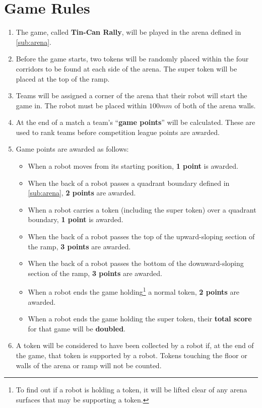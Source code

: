 \section {Game Rules}
\label{game-rules}

\begin{enumerate}
\item The game, called \textbf{Tin-Can Rally}, will be played in the arena defined in \autoref{sub:arena}.
\item Before the game starts, two tokens will be randomly placed within the four corridors to be found at each side of the arena.  The super token will be placed at the top of the ramp.
\item Teams will be assigned a corner of the arena that their robot will start the game in.
 The robot must be placed within $100mm$ of both of the arena walls.
\item At the end of a match a team's ``\textbf{game points}'' will be calculated.
 These are used to rank teams before competition league points are awarded.

\item Game points are awarded as follows:

\begin{itemize}
\item When a robot moves from its starting position, \textbf{1 point} is awarded.
\item When the back of a robot passes a quadrant boundary defined in \autoref{sub:arena}, \textbf{2 points} are awarded.
\item When a robot carries a token (including the super token) over a quadrant boundary, \textbf{1 point} is awarded.
\item When the back of a robot passes the top of the upward-sloping section of the ramp, \textbf{3 points} are awarded.
\item When the back of a robot passes the bottom of the downward-sloping section of the ramp, \textbf{3 points} are awarded.
\item When a robot ends the game holding\footnote{To find out if a robot is holding a token, it will be lifted clear of any arena surfaces that may be supporting a token.} a normal token, \textbf{2 points} are awarded.
\item When a robot ends the game holding the super token, their \textbf{total score} for that game will be \textbf{doubled}.
\end{itemize}

\item A token will be considered to have been collected by a robot if, at the end of the game, that token is supported by a robot.
 Tokens touching the floor or walls of the arena or ramp will not be counted.


\end{enumerate}
